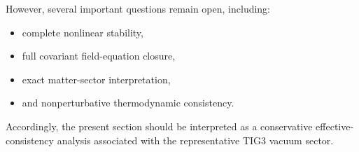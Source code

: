 However, several important questions remain open, including:

\begin{itemize}[leftmargin=0.6cm]
\item complete nonlinear stability,
\item full covariant field-equation closure,
\item exact matter-sector interpretation,
\item and nonperturbative thermodynamic consistency.
\end{itemize}

Accordingly, the present section should be interpreted as a conservative effective-consistency analysis associated with the representative TIG3 vacuum sector.
